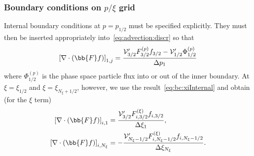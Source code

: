 \documentclass{notes}
\newcommand{\Vp}{\mathcal{V}'}
\begin{document}
    \subsubsection{Boundary conditions on $p/\xi$ grid}
    Internal boundary conditions at $p=p_{1/2}$ must be specified explicitly.
    They must then be inserted appropriately into~\eqref{eq:advection:discr} so
    that
    \begin{equation}
        \left[ \nabla\cdot\left( \bb{F}f \right) \right]_{1,j} = \frac{
            \Vp_{3/2} F_{3/2}^{(p)} f_{3/2} - \Vp_{1/2}\Phi^{(p)}_{1/2}
        }{\Delta p_{1}}
    \end{equation}
    where $\Phi_{1/2}^{(p)}$ is the phase space particle flux into or out of
    the inner boundary. At $\xi=\xi_{1/2}$ and $\xi=\xi_{N_\xi+1/2}$, however,
    we use the result~\eqref{eq:bc:xiInternal} and obtain (for the $\xi$ term)
    \begin{equation}
        \begin{aligned}
            \left[ \nabla\cdot\left( \bb{F} f \right) \right]_{i,1} &=
                \frac{\Vp_{3/2} F^{(\xi)}_{i,3/2} f_{i,3/2}}{\Delta\xi_{1}},\\
            \left[ \nabla\cdot\left( \bb{F} f \right) \right]_{i,N_\xi} &=
                -\frac{\Vp_{N_\xi-1/2} F^{(\xi)}_{i,N_\xi-1/2} f_{i,N_\xi-1/2}}{\Delta\xi_{N_\xi}}.
        \end{aligned}
    \end{equation}
\end{document}
